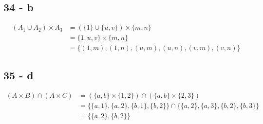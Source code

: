 \documentclass[12pt]{article}
\begin{document}
\subsection*{34 - b}
\begin{align*}
    (A_1 \cup A_2) \times A_3 &= (\{1\} \cup \{u,v\})\times \{m,n\} \\
    &= \{1, u, v\} \times \{m,n\} \\
    &= \{(1, m), (1, n), (u, m), (u, n), (v, m), (v, n)\}
\end{align*}

\subsection*{35 - d}
\begin{align*}
    (A \times B)\cap(A \times C) &= (\{ a, b \} \times \{1,2\}) \cap (\{ a, b \} \times \{2,3\}) \\
    &= \{ \{a, 1\}, \{a, 2\}, \{b, 1\}, \{b, 2\} \} \cap \{ \{a, 2\}, \{a, 3\}, \{b, 2\}, \{b, 3\} \} \\
    &= \{ \{a, 2\}, \{b, 2\} \}
\end{align*}
\end{document}
